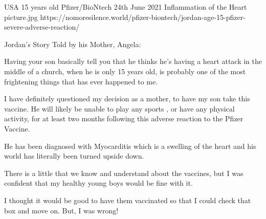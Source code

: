 {USA}
{15 years old}
{Pfizer/BioNtech}
{24th June 2021}
{Inflammation of the Heart}
{picture.jpg}
{https://nomoresilence.world/pfizer-biontech/jordan-age-15-pfizer-severe-adverse-reaction/}
{

Jordan’s Story Told by his Mother, Angela:

Having your son basically tell you that he thinks he’s having a heart attack in
the middle of a church, when he is only 15 years old, is probably one of the
most frightening things that has ever happened to me.

I have definitely questioned my decision as a mother, to have my son take this
vaccine. He will likely be unable to play any sports , or have any physical
activity, for at least two months following this adverse reaction to the Pfizer
Vaccine.

He has been diagnosed with Myocarditis which is a swelling of the heart and his
world has literally been turned upside down.

There is a little that we know and understand about the vaccines, but I was
confident that my healthy young boys would be fine with it.

I thought it would be good to have them vaccinated so that I could check that
box and move on. But, I was wrong!

}
